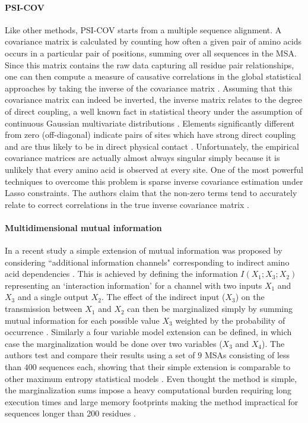 \paragraph{PSI-COV}
Like other methods, PSI-COV \cite{jones2012psicov} starts from a multiple sequence alignment.
A covariance matrix is calculated by counting how often a given pair of amino acids occurs in a particular pair of positions, summing over all sequences in the MSA.
Since this matrix contains the raw data capturing all residue pair relationships, one can then compute a measure of causative correlations in the global statistical approaches by taking the inverse of the covariance matrix \cite{jones2012psicov, marks2012protein}.
Assuming that this covariance matrix can indeed be inverted, the inverse matrix relates to the degree of direct coupling, a well known fact in statistical theory under the assumption of continuous Gaussian multivariate distributions \cite{marks2012protein}.
Elements significantly different from zero (off-diagonal) indicate pairs of sites which have strong direct coupling and are thus likely to be in direct physical contact \cite{jones2012psicov}.
Unfortunately, the empirical covariance matrices are actually almost always singular simply because it is unlikely that every amino acid is observed at every site.
One of the most powerful techniques to overcome this problem is sparse inverse covariance estimation under Lasso constraints.
The authors claim that the non-zero terms tend to accurately relate to correct correlations in the true inverse covariance matrix \cite{jones2012psicov}.

\paragraph{Multidimensional mutual information}
In a recent study a simple extension of mutual information was proposed by considering ``additional information channels" corresponding to indirect
amino acid dependencies \cite{clark2014multidimensional}.
This is achieved by defining the information $I(X_1 ; X_3 ; X_2)$ representing an `interaction information' for a channel with two inputs $X_1$ and $X_3$ and a single output $X_2$.
The effect of the indirect input ($X_3$) on the transmission between $X_1$ and $X_2$ can then be marginalized simply by summing mutual information for each possible value $X_3$ weighted by the probability of occurrence \cite{clark2014multidimensional}.
Similarly a four variable model extension can be defined, in which case the marginalization would be done over two variables ($X_3$ and $X_4$).
The authors test and compare their results using a set of $9$ MSAs consisting of less than $400$ sequences each, showing that their simple extension is comparable to other maximum entropy statistical models \cite{clark2014multidimensional}.
Even thought the method is simple, the marginalization sums impose a heavy computational burden requiring long execution times and large memory footprints making the method impractical for sequences longer than 200 residues \cite{clark2014multidimensional}.

